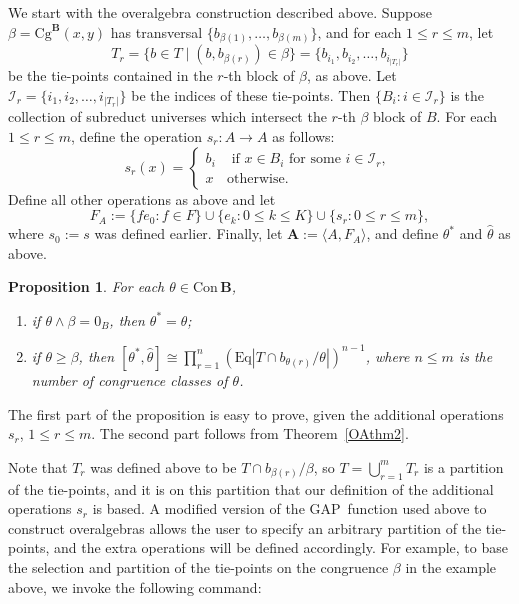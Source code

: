 \documentclass[cm,dissertation]{uhthesis}
\theoremstyle{plain}
\newtheorem{prop}[theorem]{Proposition}
\theoremstyle{definition}
\theoremstyle{remark}
\numberwithin{theorem}{section}
\numberwithin{claim}{chapter}
\numberwithin{equation}{section}
\numberwithin{conjecture}{chapter}
\newcommand{\<}{\ensuremath{\langle}}
\renewcommand{\>}{\ensuremath{\rangle}}
\renewcommand{\leq}{\ensuremath{\leqslant}}
\renewcommand{\geq}{\ensuremath{\geqslant}}
\newcommand{\meet}{\ensuremath{\wedge}}
\newcommand{\Eq}{\ensuremath{\mathrm{Eq}}}
\newcommand{\Cg}{\ensuremath{\mathrm{Cg}}}
\newcommand{\Con}{\ensuremath{\mathrm{Con\,}}}
\newcommand{\GAP}{\textsf{GAP}}
\newcommand{\0}{\ensuremath{\mathbf{0}}}
\newcommand{\1}{\ensuremath{\mathbf{1}}}
\newcommand{\2}{\ensuremath{\mathbf{2}}}
\newcommand{\3}{\ensuremath{\mathbf{3}}}
\newcommand{\4}{\ensuremath{\mathbf{4}}}
\newcommand{\5}{\ensuremath{\mathbf{5}}}
\newcommand{\bA}{\ensuremath{\mathbf{A}}}
\newcommand{\bB}{\ensuremath{\mathbf{B}}}
\newcommand{\sI}{\ensuremath{\mathscr{I}}}
\begin{document}
We start with the overalgebra construction described above.
Suppose $\beta = \Cg^\bB(x,y)$ has transversal 
$\{b_{\beta(1)}, \dots, b_{\beta(m)}\}$, and for each $1\leq r\leq m$, let 
\[
T_r = \{b\in T \mid (b, b_{\beta(r)}) \in \beta\} = 
\{b_{i_1}, b_{i_2}, \dots, b_{i_{|T_r|}}\}
\]
be the tie-points contained in the $r$-th block of $\beta$, as above. 
Let $\sI_r = \{i_1, i_2, \dots, i_{|T_r|}\}$ be the indices of these
tie-points.  Then $\{B_i : i \in \sI_r\}$ is the collection of subreduct
universes which intersect the $r$-th $\beta$ block of $B$.  
For each $1\leq r\leq m$, define the operation $s_r : A\rightarrow A$ as follows:
\[
s_r(x) =
\begin{cases}
  b_i & \text{ if $x \in B_i$ for some $i \in \sI_r$, }\\
  x & \text{otherwise}.
\end{cases}
\]
Define all other operations as above and let
\[
F_A := \{f e_0 : f\in F\} \cup \{e_k : 0\leq k \leq K\} \cup 
\{s_r : 0\leq r \leq m\},
\]
where $s_0 := s$ was defined earlier.  Finally, let 
$\bA:=\<A, F_A\>$, and define $\theta^*$ and $\widehat{\theta}$ as above.
\begin{prop}
  \label{prop:expansion}
  For each  $\theta \in \Con\bB$,
  \begin{enumerate}
  \item if $\theta \meet \beta = 0_B$, then $\theta^* = \widehat{\theta}$;
  \item if $\theta \geq \beta$, then $[\theta^*, \widehat{\theta}] \cong
    \prod_{r=1}^n (\Eq |T \cap b_{\theta(r)}/\theta|)^{n-1}$, where $n\leq m$  is
    the number of congruence classes of $\theta$.
  \end{enumerate}
\end{prop}
The first part of the proposition is easy to prove, given the additional
operations 
$s_r$, $1\leq r \leq m$.
The second part follows from Theorem~\ref{OAthm2}.

Note that $T_r$ was defined above to be $T \cap b_{\beta(r)}/\beta$, so $T =
\bigcup_{r=1}^m T_r$ is a partition of the tie-points, and it is on this partition
that our definition of the additional operations $s_r$ is based.  A modified version
of the \GAP\ function used above to construct overalgebras allows the user to specify an
arbitrary partition of the tie-points, and the extra operations will be
defined accordingly.  For example, to base the selection and partition of the
tie-points on the congruence $\beta$ in the example above, we invoke the
following command: 
\end{document}
